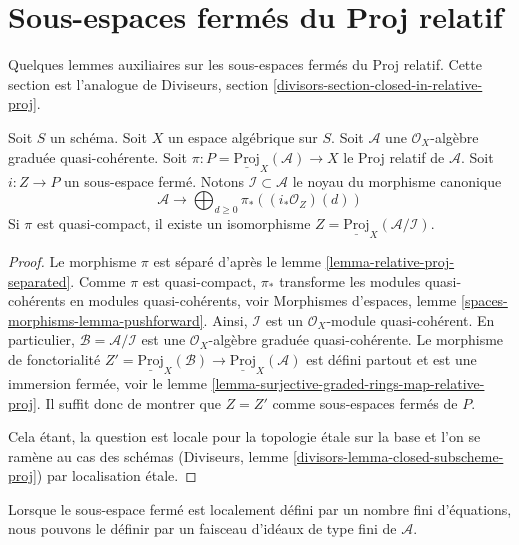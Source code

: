 \section{Sous-espaces fermés du Proj relatif}
\label{section-closed-in-relative-proj}

\noindent
Quelques lemmes auxiliaires sur les sous-espaces fermés du Proj relatif.
Cette section est l'analogue de
Diviseurs, section \ref{divisors-section-closed-in-relative-proj}.

\begin{lemma}
\label{lemma-closed-subscheme-proj}
Soit $S$ un schéma. Soit $X$ un espace algébrique sur $S$.
Soit $\mathcal{A}$ une $\mathcal{O}_X$-algèbre graduée quasi-cohérente. Soit
$\pi : P = \underline{\text{Proj}}_X(\mathcal{A}) \to X$ le Proj relatif
de $\mathcal{A}$. Soit $i : Z \to P$ un sous-espace fermé. Notons
$\mathcal{I} \subset \mathcal{A}$ le noyau du morphisme canonique
$$
\mathcal{A}
\longrightarrow
\bigoplus\nolimits_{d \geq 0} \pi_*\left((i_*\mathcal{O}_Z)(d)\right)
$$
Si $\pi$ est quasi-compact, il existe un isomorphisme
$Z = \underline{\text{Proj}}_X(\mathcal{A}/\mathcal{I})$.
\end{lemma}

\begin{proof}
Le morphisme $\pi$ est séparé d'après le
lemme \ref{lemma-relative-proj-separated}.
Comme $\pi$ est quasi-compact, $\pi_*$ transforme les modules quasi-cohérents
en modules quasi-cohérents, voir
Morphismes d'espaces, lemme \ref{spaces-morphisms-lemma-pushforward}.
Ainsi, $\mathcal{I}$ est un $\mathcal{O}_X$-module quasi-cohérent.
En particulier, $\mathcal{B} = \mathcal{A}/\mathcal{I}$ est une
$\mathcal{O}_X$-algèbre graduée quasi-cohérente. Le morphisme de fonctorialité
$Z' = \underline{\text{Proj}}_X(\mathcal{B}) \to
\underline{\text{Proj}}_X(\mathcal{A})$ est défini partout et est
une immersion fermée, voir le lemme
\ref{lemma-surjective-graded-rings-map-relative-proj}.
Il suffit donc de montrer que $Z = Z'$ comme sous-espaces fermés de $P$.

\medskip\noindent
Cela étant, la question est locale pour la topologie \'etale sur la base et l'on
se ramène au cas des schémas
(Diviseurs, lemme \ref{divisors-lemma-closed-subscheme-proj})
par localisation \'etale.
\end{proof}

\noindent
Lorsque le sous-espace fermé est localement défini par un nombre fini
d'équations, nous pouvons le définir par un faisceau d'idéaux de type fini de
$\mathcal{A}$.

